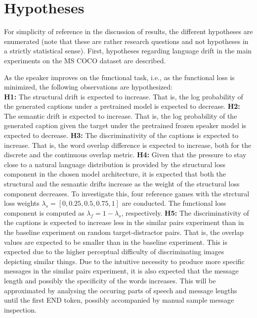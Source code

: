 \section{Hypotheses}

For simplicity of reference in the discussion of results, the different hypotheses are enumerated (note that these are rather research questions and not hypotheses in a strictly statistical sense).
First, hypotheses regarding language drift in the main experiments on the MS COCO dataset are described. 

As the speaker improves on the functional task, i.e., as the functional loss is minimized, the following observations are hypothesized: \\
\newline 
\textbf{H1:} The structural drift is expected to increase. That is, the log probability of the generated captions under a pretrained model is expected to decrease. \newline
\textbf{H2:} The semantic drift is expected to increase. That is, the log probability of the generated caption given the target under the pretrained frozen speaker model is expected to decrease. \newline
\textbf{H3:} The discriminativity of the captions is expected to increase. That is, the word overlap difference is expected to increase, both for the discrete and the continuous overlap metric. \newline
\textbf{H4:} Given that the pressure to stay close to a natural language distribution is provided by the structural loss component in the chosen model architecture, it is expected that both the structural and the semantic drifts increase as the weight of the structural loss component decreases. To investigate this, four reference games with the strctural loss weights $\lambda_s = [0, 0.25, 0.5, 0.75, 1]$ are conducted. The functional loss component is computed as $\lambda_f = 1 - \lambda_s$, respectively. \newline
\textbf{H5:} The discriminativity of the captions is expected to increase less in the similar pairs experiment than in the baseline experiment on random target-distractor pairs. That is, the overlap values are expected to be smaller than in the baseline experiment. This is expected due to the higher perceptual difficulty of discriminating images depicting similar things. Due to the intuitive necessity to produce more specific messages in the similar pairs experiment, it is also expected that the message length and possibly the specificity of the words increases. This will be approximated by analysing the occuring parts of speech and message lengths until the first END token, possibly accompanied by manual sample message inspection.\newline
